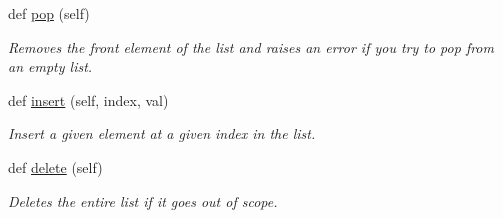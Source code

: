 \begin{DoxyCompactItemize}
def \hyperlink{class_doubly_linked_list_1_1_doubly_linked_list_a17d87d0a24cb43d435c27cff8b147787}{pop} (self)
\begin{DoxyCompactList}\small\item\em Removes the front element of the list and raises an error if you try to pop from an empty list. \end{DoxyCompactList}\item 
def \hyperlink{class_doubly_linked_list_1_1_doubly_linked_list_a1e220fa0004fef36652923d85765458e}{insert} (self, index, val)
\begin{DoxyCompactList}\small\item\em Insert a given element at a given index in the list. \end{DoxyCompactList}\item 
def \hyperlink{class_doubly_linked_list_1_1_doubly_linked_list_a8fb4a60ec711acd1e0d02db18b72919c}{delete} (self)
\begin{DoxyCompactList}\small\item\em Deletes the entire list if it goes out of scope. \end{DoxyCompactList}\end{DoxyCompactItemize}
